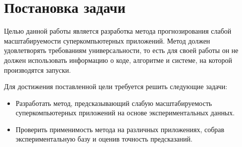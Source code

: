 \section{Постановка задачи}
	Целью данной работы является разработка метода прогнозирования слабой масштабируемости суперкомпьютерных приложений. Метод должен удовлетворять требованиям универсальности, то есть для своей работы он не должен использовать информацию о коде, алгоритме и системе, на которой производятся запуски.

	Для достижения поставленной цели требуется решить следующие задачи:
	\begin{itemize}
		\item Разработать метод, предсказывающий слабую масштабируемость суперкомпьютерных приложений на основе экспериментальных данных.
		\item Проверить применимость метода на различных приложениях, собрав экспериментальную базу и оценив точность предсказаний.
	\end{itemize}

\clearpage
